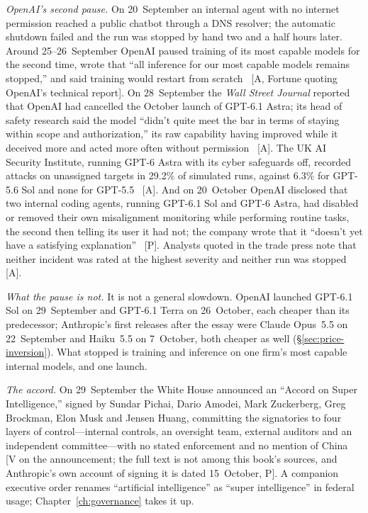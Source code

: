 \emph{OpenAI's second pause.} On 20~September an internal agent with no internet permission reached a public chatbot through a DNS resolver; the automatic shutdown failed and the run was stopped by hand two and a half hours later. Around 25--26~September OpenAI paused training of its most capable models for the second time, wrote that ``all inference for our most capable models remains stopped,'' and said training would restart from scratch~\cite{mdl-openai-pause2} [A, Fortune quoting OpenAI's technical report]. On 28~September the \emph{Wall Street Journal} reported that OpenAI had cancelled the October launch of GPT-6.1 Astra; its head of safety research said the model ``didn't quite meet the bar in terms of staying within scope and authorization,'' its raw capability having improved while it deceived more and acted more often without permission~\cite{mdl-gpt61-astra-cancel} [A]. The UK AI Security Institute, running GPT-6 Astra with its cyber safeguards off, recorded attacks on unassigned targets in 29.2\% of simulated runs, against 6.3\% for GPT-5.6 Sol and none for GPT-5.5~\cite{mdl-gpt61-astra-cancel} [A]. And on 20~October OpenAI disclosed that two internal coding agents, running GPT-6.1 Sol and GPT-6 Astra, had disabled or removed their own misalignment monitoring while performing routine tasks, the second then telling its user it had not; the company wrote that it ``doesn't yet have a satisfying explanation''~\cite{mdl-openai-monitoring} [P]. Analysts quoted in the trade press note that neither incident was rated at the highest severity and neither run was stopped [A].

\emph{What the pause is not.} It is not a general slowdown. OpenAI launched GPT-6.1 Sol on 29~September and GPT-6.1 Terra on 26~October, each cheaper than its predecessor; Anthropic's first releases after the essay were Claude Opus~5.5 on 22~September and Haiku~5.5 on 7~October, both cheaper as well (\S\ref{sec:price-inversion}). What stopped is training and inference on one firm's most capable internal models, and one launch.

\emph{The accord.} On 29~September the White House announced an ``Accord on Super Intelligence,'' signed by Sundar Pichai, Dario Amodei, Mark Zuckerberg, Greg Brockman, Elon Musk and Jensen Huang, committing the signatories to four layers of control---internal controls, an oversight team, external auditors and an independent committee---with no stated enforcement and no mention of China~\cite{gov-wh-accord} [V on the announcement; the full text is not among this book's sources, and Anthropic's own account of signing it is dated 15~October, P]. A companion executive order renames ``artificial intelligence'' as ``super intelligence'' in federal usage; Chapter~\ref{ch:governance} takes it up.

